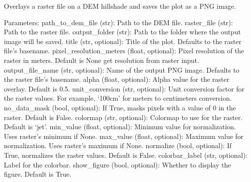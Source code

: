 \documentclass[letterpaper,10pt,english]{sphinxmanual}
\begin{document}
\begin{fulllineitems}
\label{\detokenize{akhdefo_functions:akhdefo_functions.AkhdefoPlot.akhdefo_viewer}}
\pysigstartsignatures
{}
\pysigstopsignatures
\sphinxAtStartPar
Overlays a raster file on a DEM hillshade and saves the plot as a PNG image.

\sphinxAtStartPar
Parameters:
path\_to\_dem\_file (str): Path to the DEM file.
raster\_file (str): Path to the raster file.
output\_folder (str): Path to the folder where the output image will be saved.
title (str, optional): Title of the plot. Defaults to the raster file’s basename.
pixel\_resolution\_meters (float, optional): Pixel resolution of the raster in meters. Default is None get resolution from raster input.
output\_file\_name (str, optional): Name of the output PNG image. Defaults to the raster file’s basename.
alpha (float, optional): Alpha value for the raster overlay. Default is 0.5.
unit\_conversion (str, optional): Unit conversion factor for the raster values. For example, ‘100cm’ for meters to centimeters conversion.
no\_data\_mask (bool, optional): If True, masks pixels with a value of 0 in the raster. Default is False.
colormap (str, optional): Colormap to use for the raster. Default is ‘jet’.
min\_value (float, optional): Minimum value for normalization. Uses raster’s minimum if None.
max\_value (float, optional): Maximum value for normalization. Uses raster’s maximum if None.
normalize (bool, optional): If True, normalizes the raster values. Default is False.
colorbar\_label (str, optional): Label for the colorbar. 
show\_figure (bool, optional): Whether to display the figure. Default is True.


\end{fulllineitems}
\end{document}
